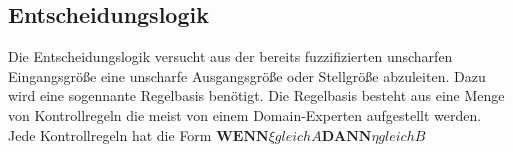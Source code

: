 \documentclass[12pt,a4paper,bibliography=totocnumbered,listof=totocnumbered]{scrartcl}
\begin{document}
\subsection{Entscheidungslogik}

Die Entscheidungslogik versucht aus der bereits fuzzifizierten unscharfen Eingangsgröße eine unscharfe Ausgangsgröße oder Stellgröße abzuleiten. Dazu wird eine sogennante Regelbasis benötigt. Die Regelbasis besteht aus eine Menge von Kontrollregeln die meist von einem Domain-Experten aufgestellt werden. Jede Kontrollregeln hat die Form $\textbf{WENN}  \xi gleich A \textbf{DANN} \eta gleich B$
\end{document}
